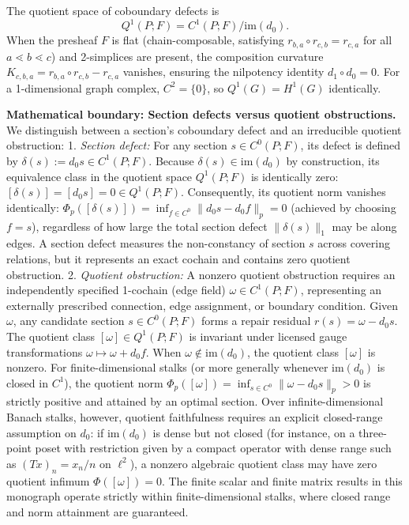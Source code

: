\documentclass[
]{article}
\begin{document}
The quotient space of coboundary defects is
\[Q^1(P; F) = C^1(P; F) / \mathrm{im}(d_0).\]
When the presheaf \(F\) is flat (chain-composable, satisfying \(r_{b,a} \circ r_{c,b} = r_{c,a}\) for all \(a \lessdot b \lessdot c\)) and 2-simplices are present, the composition curvature \(K_{c,b,a} = r_{b,a} \circ r_{c,b} - r_{c,a}\) vanishes, ensuring the nilpotency identity \(d_1 \circ d_0 = 0\). For a 1-dimensional graph complex, \(C^2 = \{0\}\), so \(Q^1(G) = H^1(G)\) identically.

\textbf{Mathematical boundary: Section defects versus quotient obstructions.}
We distinguish between a section's coboundary defect and an irreducible quotient obstruction:
1. \emph{Section defect:} For any section \(s \in C^0(P; F)\), its defect is defined by \(\delta(s) := d_0 s \in C^1(P; F)\). Because \(\delta(s) \in \mathrm{im}(d_0)\) by construction, its equivalence class in the quotient space \(Q^1(P; F)\) is identically zero: \([\delta(s)] = [d_0 s] = 0 \in Q^1(P; F)\). Consequently, its quotient norm vanishes identically: \(\Phi_p([\delta(s)]) = \inf_{f \in C^0} \|d_0 s - d_0 f\|_p = 0\) (achieved by choosing \(f = s\)), regardless of how large the total section defect \(\|\delta(s)\|_1\) may be along edges. A section defect measures the non-constancy of section \(s\) across covering relations, but it represents an exact cochain and contains zero quotient obstruction.
2. \emph{Quotient obstruction:} A nonzero quotient obstruction requires an independently specified 1-cochain (edge field) \(\omega \in C^1(P; F)\), representing an externally prescribed connection, edge assignment, or boundary condition. Given \(\omega\), any candidate section \(s \in C^0(P; F)\) forms a repair residual \(r(s) = \omega - d_0 s\). The quotient class \([\omega] \in Q^1(P; F)\) is invariant under licensed gauge transformations \(\omega \mapsto \omega + d_0 f\). When \(\omega \notin \mathrm{im}(d_0)\), the quotient class \([\omega]\) is nonzero. For finite-dimensional stalks (or more generally whenever \(\mathrm{im}(d_0)\) is closed in \(C^1\)), the quotient norm \(\Phi_p([\omega]) = \inf_{s \in C^0} \|\omega - d_0 s\|_p > 0\) is strictly positive and attained by an optimal section. Over infinite-dimensional Banach stalks, however, quotient faithfulness requires an explicit closed-range assumption on \(d_0\): if \(\mathrm{im}(d_0)\) is dense but not closed (for instance, on a three-point poset with restriction given by a compact operator with dense range such as \((Tx)_n = x_n/n\) on \(\ell^2\)), a nonzero algebraic quotient class may have zero quotient infimum \(\Phi([\omega]) = 0\). The finite scalar and finite matrix results in this monograph operate strictly within finite-dimensional stalks, where closed range and norm attainment are guaranteed.
\end{document}
